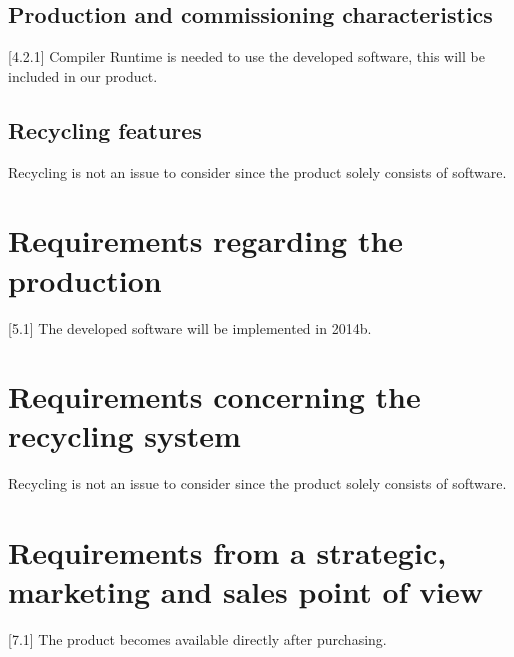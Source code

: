 \subsection{Production and commissioning characteristics}
[4.2.1] \matlab Compiler Runtime is needed to use the developed software, this will be included in our product. 

\subsection{Recycling features}
Recycling is not an issue to consider since the product solely consists of software.
\section{Requirements regarding the production}
[5.1] The developed software will be implemented in \matlab 2014b.

\section{Requirements concerning the recycling system}
Recycling is not an issue to consider since the product solely consists of software.

\section{Requirements from a strategic, marketing and sales point of view}
[7.1] The product becomes available directly after purchasing.